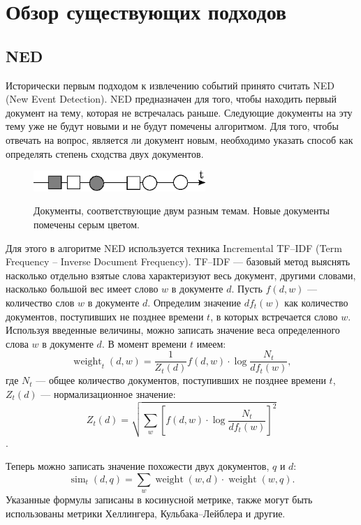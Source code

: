 \documentclass[12pt, a4paper]{article}
\DeclareMathOperator{\weight}{weight}
\DeclareMathOperator{\simu}{sim}
\begin{document}
  \section{Обзор существующих подходов}
  \subsection{NED}
  
	Исторически первым подходом к извлечению событий принято считать NED (New Event Detection)\cite{ned}. NED предназначен для того, чтобы находить первый документ на тему, которая не встречалась раньше. Следующие документы на эту тему уже не будут новыми и не будут помечены алгоритмом. Для того, чтобы отвечать на вопрос, является ли документ новым, необходимо указать способ как определять степень сходства двух документов.
	
\begin{figure}[H]
  \centering
  \label{ned-pic}
  \includegraphics[width=0.58\textwidth]{ned.eps}
  \\
  \caption{Документы, соответствующие двум разным темам. Новые документы помечены серым цветом.}
  \end{figure}  

	Для этого в алгоритме NED используется техника Incremental TF--IDF (Term Frequency -- Inverse Document Frequency). TF--IDF --- базовый метод выяснять насколько отдельно взятые слова характеризуют весь документ, другими словами, насколько большой вес имеет слово $w$ в документе $d$. Пусть $f(d,w)$ --- количество слов $w$ в документе $d$. Определим значение $df_t(w)$ как количество документов, поступивших не позднее времени $t$, в которых встречается слово $w$. Используя введенные величины, можно записать значение веса определенного слова $w$ в документе $d$. В момент времени $t$ имеем:
	\begin{equation}
	\weight_t(d,w) = \frac{1}{Z_t(d)}f(d,w) \cdot \log \frac{N_t}{df_t(w)},
	\end{equation}
	где $N_t$ --- общее количество документов, поступивших не позднее времени $t$, $Z_t(d)$ --- нормализационное значение:
	\begin{equation}
	Z_t(d) = \sqrt{\sum_w \left[ f(d,w) \cdot \log \frac{N_t}{df_t(w)} \right]^2}
	\end{equation}.
	
	Теперь можно записать значение похожести двух документов, $q$ и $d$:
	\begin{equation}
	\simu_t(d,q) = \sum_w \weight(w, d) \cdot \weight(w, q).
	\end{equation}
	Указанные формулы записаны в косинусной метрике, также могут быть использованы метрики Хеллингера, Кульбака--Лейблера и другие.
	
\end{document}
